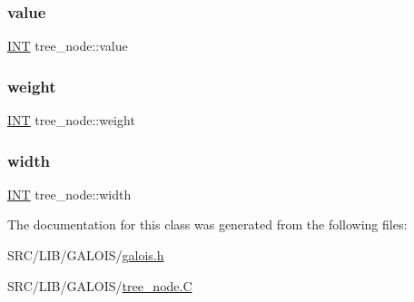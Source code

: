 \mbox{\label{classtree__node_a16080347be28a0cfa223c05b52524720}} 
\subsubsection{\texorpdfstring{value}{value}}
{\footnotesize\ttfamily \mbox{\hyperlink{galois_8h_a09fddde158a3a20bd2dcadb609de11dc}{I\+NT}} tree\+\_\+node\+::value}

\mbox{\label{classtree__node_a0a276f61a17a2ff66cd64f8fc9897dc2}} 
\subsubsection{\texorpdfstring{weight}{weight}}
{\footnotesize\ttfamily \mbox{\hyperlink{galois_8h_a09fddde158a3a20bd2dcadb609de11dc}{I\+NT}} tree\+\_\+node\+::weight}

\mbox{\label{classtree__node_a25a99d66462002bafce23a7b36c1cbff}} 
\subsubsection{\texorpdfstring{width}{width}}
{\footnotesize\ttfamily \mbox{\hyperlink{galois_8h_a09fddde158a3a20bd2dcadb609de11dc}{I\+NT}} tree\+\_\+node\+::width}



The documentation for this class was generated from the following files\+:\begin{DoxyCompactItemize}
\item 
S\+R\+C/\+L\+I\+B/\+G\+A\+L\+O\+I\+S/\mbox{\hyperlink{galois_8h}{galois.\+h}}\item 
S\+R\+C/\+L\+I\+B/\+G\+A\+L\+O\+I\+S/\mbox{\hyperlink{tree__node_8_c}{tree\+\_\+node.\+C}}\end{DoxyCompactItemize}
